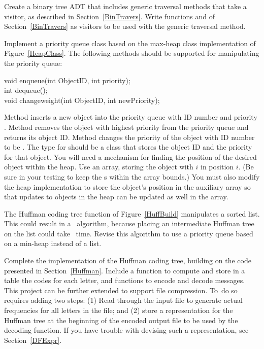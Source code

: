 \begin{projects}
\item
Create a binary tree ADT that includes generic traversal methods that
take a visitor, as described in Section~\ref{BinTravers}.
Write functions  and  of
Section~\ref{BinTravers} as visitors to be used with the generic
traversal method.

\item
\label{HeapProject}
Implement a priority queue class based on the
max-heap class implementation of Figure~\ref{HeapClass}.
The following methods should be supported for manipulating the
priority queue:

\begin{progenvexer}
void enqueue(int ObjectID, int priority);\\
int dequeue();\\
void changeweight(int ObjectID, int newPriority);
\end{progenvexer}

\noindent
Method  inserts a new object into the priority queue
with ID number  and priority
.
Method  removes the object with highest priority from
the priority queue and returns its object ID.
Method  changes the priority of the object with
ID number  to be .
The type for  should be a class that stores the
object ID and the priority for that object.
You will need a mechanism for finding the position of the desired
object within the heap.
Use an array, storing the object with  \(i\) in
position \(i\).
(Be sure in your testing to keep the s within the
array bounds.)
You must also modify the heap implementation to store the
object's position in the auxiliary array so that updates to
objects in the heap can be updated as well in the array.

\item
The Huffman coding tree function  of
Figure~\ref{HuffBuild} manipulates a sorted list.
This could result in a \Thetantwo\ algorithm, because placing an
intermediate Huffman tree on the list could take \Thetan\ time.
Revise this algorithm to use a priority queue
based on a min-heap instead of a
list.

\item
\label{HuffFileEx}
Complete the implementation of the Huffman coding tree, building on
the code presented in Section~\ref{Huffman}.
Include a function to compute and store in a table the codes for each
letter, and functions to encode and decode messages.
This project can be further extended to support file compression.
To~do so requires adding two steps:
(1) Read through the input file to generate actual frequencies for all
letters in the file; and
(2) store a representation for the Huffman tree at the beginning of
the encoded output file to be used by the decoding function.
If you have trouble with devising such a representation, see
Section~\ref{DFExpr}.

\end{projects}
